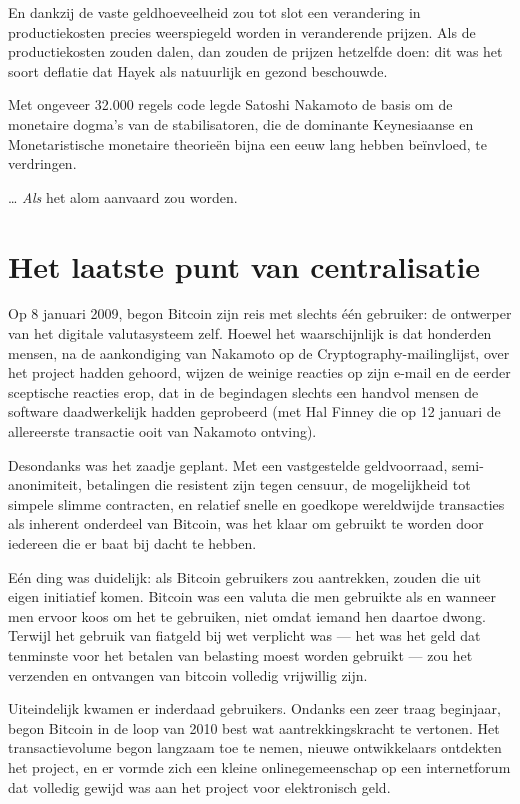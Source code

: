 \documentclass[smalldemyvopaper,11pt,twoside,onecolumn,openright,extrafontsizes,hidelinks]{memoir}
\begin{document}
En dankzij de vaste geldhoeveelheid zou tot slot een verandering in
productiekosten precies weerspiegeld worden in veranderende prijzen. Als
de productiekosten zouden dalen, dan zouden de prijzen hetzelfde doen:
dit was het soort deflatie dat Hayek als natuurlijk en gezond
beschouwde.

Met ongeveer 32.000 regels code legde Satoshi Nakamoto de basis om de
monetaire dogma's van de stabilisatoren, die de dominante Keynesiaanse
en Monetaristische monetaire theorieën bijna een eeuw lang hebben
beïnvloed, te verdringen.

\ldots{} \emph{Als} het alom aanvaard zou worden.

\section{Het laatste punt van
centralisatie}\label{het-laatste-punt-van-centralisatie}

Op 8 januari 2009, begon Bitcoin zijn reis met slechts één gebruiker: de
ontwerper van het digitale valutasysteem zelf. Hoewel het waarschijnlijk
is dat honderden mensen, na de aankondiging van Nakamoto op de
Cryptography-mailinglijst, over het project hadden gehoord, wijzen de
weinige reacties op zijn e-mail en de eerder sceptische reacties erop,
dat in de begindagen slechts een handvol mensen de software
daadwerkelijk hadden geprobeerd (met Hal Finney die op 12 januari de
allereerste transactie ooit van Nakamoto ontving).

Desondanks was het zaadje geplant. Met een vastgestelde geldvoorraad,
semi-anonimiteit, betalingen die resistent zijn tegen censuur, de
mogelijkheid tot simpele slimme contracten, en relatief snelle en
goedkope wereldwijde transacties als inherent onderdeel van Bitcoin, was
het klaar om gebruikt te worden door iedereen die er baat bij dacht te
hebben.

Eén ding was duidelijk: als Bitcoin gebruikers zou aantrekken, zouden
die uit eigen initiatief komen. Bitcoin was een valuta die men gebruikte
als en wanneer men ervoor koos om het te gebruiken, niet omdat iemand
hen daartoe dwong. Terwijl het gebruik van fiatgeld bij wet verplicht
was --- het was het geld dat tenminste voor het betalen van belasting
moest worden gebruikt --- zou het verzenden en ontvangen van bitcoin
volledig vrijwillig zijn.

Uiteindelijk kwamen er inderdaad gebruikers. Ondanks een zeer traag
beginjaar, begon Bitcoin in de loop van 2010 best wat aantrekkingskracht
te vertonen. Het transactievolume begon langzaam toe te nemen, nieuwe
ontwikkelaars ontdekten het project, en er vormde zich een kleine
onlinegemeenschap op een internetforum dat volledig gewijd was aan het
project voor elektronisch geld.
\end{document}
